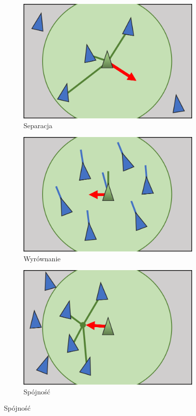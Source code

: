 \documentclass[a4paper,12pt,reqno]{article}
\begin{document}
\begin{figure}[H]%
	\centering
	\begin{subfigure}{.3\textwidth}
		\centering
		\includegraphics[width=0.8\linewidth]{graphics/boids/Separation.png}
		\caption{Separacja}	
		\label{ref:subref_a}
	\end{subfigure}%
	\begin{subfigure}{.3\textwidth}
		\centering
		\includegraphics[width=0.8\linewidth]{graphics/boids/Alignment.png}
		\caption{Wyrównanie}
		\label{ref:subref_b}
	\end{subfigure}%
		\begin{subfigure}{.3\textwidth}
		\centering
		\includegraphics[width=0.8\linewidth]{graphics/boids/Cohesion.png}
		\caption{Spójność}
		\label{ref:subref_c}
	\end{subfigure}%
\label{ref:ref}
\end{figure}
\end{document}
